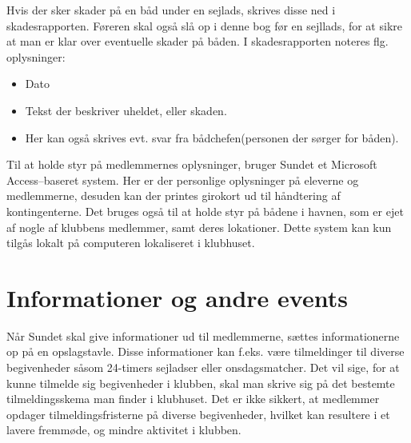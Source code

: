 Hvis der sker skader på en båd under en sejlads, skrives disse ned i skadesrapporten. 
Føreren skal også slå op i denne bog før en sejllads, for at sikre at man er klar over eventuelle skader på båden. 
I skadesrapporten noteres flg. oplysninger:

\begin{itemize}
	\item Dato
	\item Tekst der beskriver uheldet, eller skaden.
	\item Her kan også skrives evt. svar fra bådchefen(personen der sørger for båden).
\end{itemize}

Til at holde styr på medlemmernes oplysninger, bruger Sundet et Microsoft Access--baseret system. Her er der personlige oplysninger på eleverne og medlemmerne, desuden kan der printes girokort ud til håndtering af kontingenterne. Det bruges også til at holde styr på bådene i havnen, som er ejet af nogle af klubbens medlemmer, samt deres lokationer. Dette system kan kun tilgås lokalt på computeren lokaliseret i klubhuset.

\section{Informationer og andre events}

Når Sundet skal give informationer ud til medlemmerne, sættes informationerne op på en opslagstavle.
Disse informationer kan f.eks. være tilmeldinger til diverse begivenheder såsom 24-timers sejladser eller onsdagsmatcher. 
Det vil sige, for at kunne tilmelde sig begivenheder i klubben, skal man skrive sig på det bestemte tilmeldingsskema man finder i klubhuset. 
Det er ikke sikkert, at medlemmer opdager tilmeldingsfristerne på diverse begivenheder, hvilket kan resultere i et lavere fremmøde, og mindre aktivitet i klubben.
